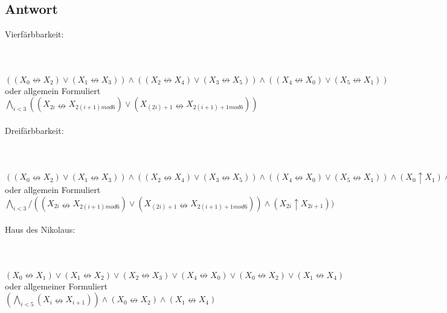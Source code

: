 \documentclass[12pt, a4paper]{article}
\begin{document}
\subsection*{Antwort}
Vierfärbbarkeit:\\
\\
\\ %
\\
$ ((X_0 \nleftrightarrow X_2) \vee (X_1 \nleftrightarrow X_3)) \wedge ((X_2 \nleftrightarrow X_4) \vee (X_3 \nleftrightarrow X_5)) \wedge ((X_4 \nleftrightarrow X_0) \vee (X_5 \nleftrightarrow X_1))$\\
oder allgemein Formuliert\\
$\bigwedge_{i<3} ((X_{2i} \nleftrightarrow X_{2(i+1) mod 6}) \vee (X_{(2i)+1} \nleftrightarrow X_{2(i+1)+1 mod 6}))$\\
\\
Dreifärbbarkeit:\\
\\
\\ %
\\
$ ((X_0 \nleftrightarrow X_2) \vee (X_1 \nleftrightarrow X_3)) \wedge ((X_2 \nleftrightarrow X_4) \vee (X_3 \nleftrightarrow X_5)) \wedge ((X_4 \nleftrightarrow X_0) \vee (X_5 \nleftrightarrow X_1)) \wedge (X_0 \uparrow X_1) \wedge (X_2 \uparrow X_3) \wedge (X_4 \uparrow X_5)$\\
oder allgemein Formuliert\\
$\bigwedge_{i<3} /((X_{2i} \nleftrightarrow X_{2(i+1) mod 6}) \vee (X_{(2i)+1} \nleftrightarrow X_{2(i+1)+1 mod 6})) \wedge (X_{2i} \uparrow X_{2i+1}) )$\\
\\
Haus des Nikolaus:\\
\\
\\ %
\\
$(X_0 \nleftrightarrow X_1) \vee (X_1 \nleftrightarrow X_2) \vee (X_2 \nleftrightarrow X_3) \vee (X_4 \nleftrightarrow X_0) \vee (X_0 \nleftrightarrow X_2) \vee (X_1 \nleftrightarrow X_4)$\\
oder allgemeiner Formuliert\\
$(\bigwedge_{i<5} (X_i \nleftrightarrow X_{i+1})) \wedge (X_0 \nleftrightarrow X_2) \wedge(X_1 \nleftrightarrow X_4)$
\end{document}
